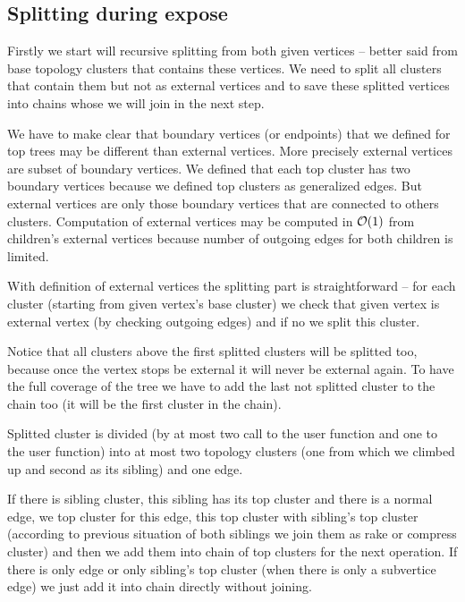 \subsection{Splitting during expose}

Firstly we start will recursive splitting from both given vertices -- better
said from base topology clusters that contains these vertices. We need to split
all clusters that contain them but not as {\I external vertices} and to save
these splitted vertices into {\I chains} whose we will join in the next step.

We have to make clear that {\I boundary vertices} (or endpoints) that we defined
for top trees may be different than {\I external vertices}. More precisely
external vertices are subset of boundary vertices. We defined that each top
cluster has two boundary vertices because we defined top clusters as generalized
edges. But external vertices are only those boundary vertices that are connected
to others clusters. Computation of external vertices may be computed in ${\cal O}(1)$
from children's external vertices because number of outgoing edges for both
children is limited.

With definition of external vertices the splitting part is straightforward --
for each cluster (starting from given vertex's base cluster) we check that given
vertex is external vertex (by checking outgoing edges) and if no we split this
cluster.

Notice that all clusters above the first splitted clusters will be splitted too,
because once the vertex stops be external it will never be external again. To
have the full coverage of the tree we have to add the last not splitted cluster
to the chain too (it will be the first cluster in the chain).

Splitted cluster is divided (by at most two call to the \Split{} user function
and one to the \Destroy{} user function) into at most two topology clusters (one
from which we climbed up and second as its sibling) and one edge.

If there is sibling cluster, this sibling has its top cluster and there is a
normal edge, we \Create{} top cluster for this edge, \Join{} this top cluster
with sibling's top cluster (according to previous situation of both siblings we
join them as rake or compress cluster) and then we add them into chain of top
clusters for the next operation. If there is only edge or only sibling's top
cluster (when there is only a subvertice edge) we just add it into chain
directly without joining.

